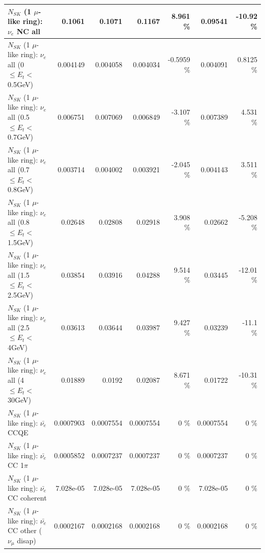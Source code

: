 \begin{table}
\begin{tabular}{| l | r | r | r  r | r  r |}
                                  $N_{SK}$ (1 $\mu$-like ring): $\nu_{e}$ NC all &          0.1061 &          0.1071 &          0.1167 &    8.961 \%  &         0.09541 &   -10.92 \%  \\ 
\hline
           $N_{SK}$ (1 $\mu$-like ring): $\nu_{e}$ all (0 $\leq E_{t} <$ 0.5GeV) &        0.004149 &        0.004058 &        0.004034 &  -0.5959 \%  &        0.004091 &   0.8125 \%  \\ 
         $N_{SK}$ (1 $\mu$-like ring): $\nu_{e}$ all (0.5 $\leq E_{t} <$ 0.7GeV) &        0.006751 &        0.007069 &        0.006849 &   -3.107 \%  &        0.007389 &    4.531 \%  \\ 
         $N_{SK}$ (1 $\mu$-like ring): $\nu_{e}$ all (0.7 $\leq E_{t} <$ 0.8GeV) &        0.003714 &        0.004002 &        0.003921 &   -2.045 \%  &        0.004143 &    3.511 \%  \\ 
         $N_{SK}$ (1 $\mu$-like ring): $\nu_{e}$ all (0.8 $\leq E_{t} <$ 1.5GeV) &         0.02648 &         0.02808 &         0.02918 &    3.908 \%  &         0.02662 &   -5.208 \%  \\ 
         $N_{SK}$ (1 $\mu$-like ring): $\nu_{e}$ all (1.5 $\leq E_{t} <$ 2.5GeV) &         0.03854 &         0.03916 &         0.04288 &    9.514 \%  &         0.03445 &   -12.01 \%  \\ 
           $N_{SK}$ (1 $\mu$-like ring): $\nu_{e}$ all (2.5 $\leq E_{t} <$ 4GeV) &         0.03613 &         0.03644 &         0.03987 &    9.427 \%  &         0.03239 &    -11.1 \%  \\ 
            $N_{SK}$ (1 $\mu$-like ring): $\nu_{e}$ all (4 $\leq E_{t} <$ 30GeV) &         0.01889 &          0.0192 &         0.02087 &    8.671 \%  &         0.01722 &   -10.31 \%  \\ 
\hline
\hline
\hline
                                $N_{SK}$ (1 $\mu$-like ring): $\bar{\nu_e}$ CCQE &       0.0007903 &       0.0007554 &       0.0007554 &        0 \%  &       0.0007554 &        0 \%  \\ 
                           $N_{SK}$ (1 $\mu$-like ring): $\bar{\nu_e}$ CC 1$\pi$ &       0.0005852 &       0.0007237 &       0.0007237 &        0 \%  &       0.0007237 &        0 \%  \\ 
                         $N_{SK}$ (1 $\mu$-like ring): $\bar{\nu_e}$ CC coherent &       7.028e-05 &       7.028e-05 &       7.028e-05 &        0 \%  &       7.028e-05 &        0 \%  \\ 
          $N_{SK}$ (1 $\mu$-like ring): $\bar{\nu_e}$ CC other ($\nu_\mu$ disap) &       0.0002167 &       0.0002168 &       0.0002168 &        0 \%  &       0.0002168 &        0 \%  \\ 

\end{tabular}
\end{table}
